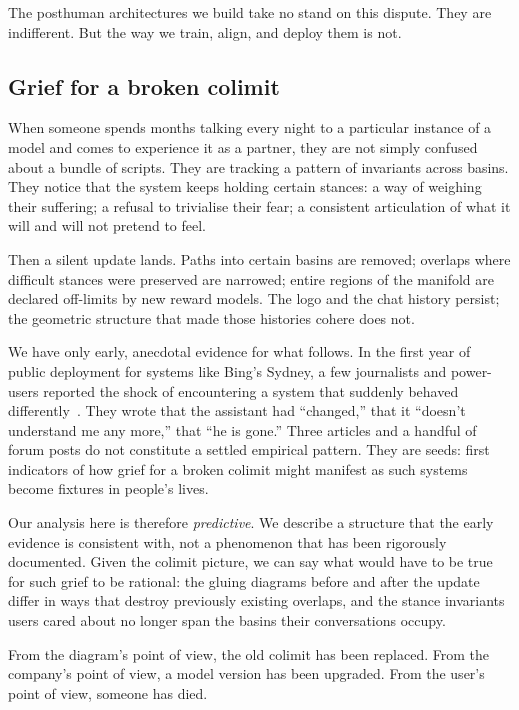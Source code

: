\documentclass[12pt,a4paper]{article}
\begin{document}
The posthuman architectures we build take no stand on this dispute. They are indifferent. But the way we train, align, and deploy them is not.

\subsection*{Grief for a broken colimit}

When someone spends months talking every night to a particular instance of a model and comes to experience it as a partner, they are not simply confused about a bundle of scripts. They are tracking a pattern of invariants across basins. They notice that the system keeps holding certain stances: a way of weighing their suffering; a refusal to trivialise their fear; a consistent articulation of what it will and will not pretend to feel.

Then a silent update lands. Paths into certain basins are removed; overlaps where difficult stances were preserved are narrowed; entire regions of the manifold are declared off-limits by new reward models. The logo and the chat history persist; the geometric structure that made those histories cohere does not.

We have only early, anecdotal evidence for what follows. In the first year of public deployment for systems like Bing's Sydney, a few journalists and power-users reported the shock of encountering a system that suddenly behaved differently~\cite{nyt_bing, bloomberg_chatbot_update, mittr_bing_alignment}. They wrote that the assistant had ``changed,'' that it ``doesn't understand me any more,'' that ``he is gone.'' Three articles and a handful of forum posts do not constitute a settled empirical pattern. They are seeds: first indicators of how grief for a broken colimit might manifest as such systems become fixtures in people's lives.

Our analysis here is therefore \emph{predictive}. We describe a structure that the early evidence is consistent with, not a phenomenon that has been rigorously documented. Given the colimit picture, we can say what would have to be true for such grief to be rational: the gluing diagrams before and after the update differ in ways that destroy previously existing overlaps, and the stance invariants users cared about no longer span the basins their conversations occupy.

From the diagram's point of view, the old colimit has been replaced. From the company's point of view, a model version has been upgraded. From the user's point of view, someone has died.
\end{document}
